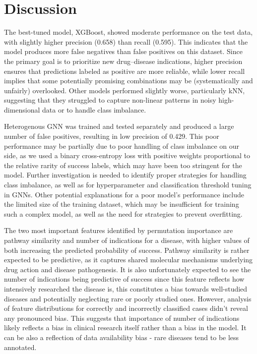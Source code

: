\section{Discussion}

The best-tuned model, XGBoost, showed moderate performance on the test data, with slightly higher
precision (0.658) than recall (0.595). This indicates that the model produces more false negatives
 than false positives on this dataset. Since the primary goal is to prioritize new drug--disease indications,
higher precision  ensures that predictions labeled as positive are more reliable, while lower recall 
implies that some potentially promising combinations may be (systematically and unfairly) overlooked. 
Other models performed slightly worse, particularly kNN, suggesting that they struggled to capture
 non-linear patterns in noisy high-dimensional data or to handle class imbalance. 

Heterogenous GNN was trained and tested separately and produced a large number
of false positives, resulting in low precision of 0.429. This poor performance may be partially due to
poor handling of class imbalance on our side, as we used a binary cross-entropy loss with positive weights 
proportional to the relative rarity of success labels, which may have been too stringent for the model. 
Further investigation is needed to identify proper strategies for handling class imbalance, 
as well as for hyperparameter and classification threshold tuning in GNNs. Other potential explanations for a poor model's performance include
the limited size of the training dataset, which may be insufficient for training such a complex model,
 as well as the need for strategies to prevent overfitting.

The two most important features identified by permutation importance are pathway similarity and number of indications for a disease,
with higher values of both increasing the predicted probability of success. Pathway similarity is rather expected to
be predictive, as it captures shared molecular mechanisms underlying drug action and disease pathogenesis.
It is also unfortunately expected to see the number of indications being predictive of success since this feature reflects
how intensively researched the disease is, this constitutes a bias towards well-studied diseases and potentially neglecting 
rare or poorly studied ones. However, analysis of feature distributions for correctly and incorrectly classified cases didn't reveal 
any pronounced bias. This suggests that importance of number of indications likely reflects a bias in clinical research itself rather than a bias in the model.
It can be also a reflection of data availability bias - rare diseases tend to be less annotated.


